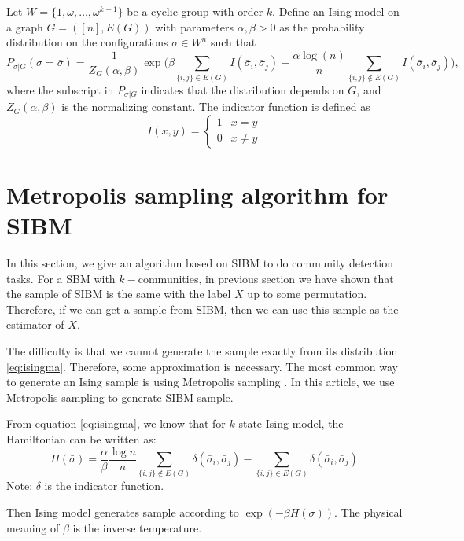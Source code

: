 \documentclass{ctexart}
\begin{document}
	Let $W=\{1, \omega, \dots, \omega^{k-1}\}$ be a cyclic group with order $k$.
	Define an Ising model on a graph $G=([n],E(G))$ with parameters $\alpha,\beta>0$
	as the probability distribution on the configurations $\sigma\in W^n$ such that
	\begin{equation} \label{eq:isingma}
	P_{\sigma|G}(\sigma=\bar{\sigma})=\frac{1}{Z_G(\alpha,\beta)}
	\exp\Big(\beta\sum_{\{i,j\}\in E(G)} I(\bar{\sigma}_i ,\bar{\sigma}_j)
	-\frac{\alpha\log(n)}{n} \sum_{\{i,j\}\notin E(G)} I(\bar{\sigma}_i, \bar{\sigma}_j)\Big) ,
	\end{equation}
	where the subscript in $P_{\sigma|G}$ indicates that the distribution depends on $G$, and 
	$Z_G(\alpha,\beta)$
	is the normalizing constant. The indicator function is defined as
	$$
	I(x ,y) = \begin{cases}
	1 & x = y\\
	0 & x \neq y
	\end{cases}
	$$
	
	\section{Metropolis sampling algorithm for SIBM}
	In this section, we give an algorithm based on SIBM to do community detection tasks.
	For a SBM with $k-$communities, in previous section we have shown that the sample of SIBM is the same with the label $X$ up to some permutation. 
	Therefore, if we can get a sample from SIBM, then we can use this sample as the estimator of $X$.
	
	The difficulty is that we cannot generate the sample exactly from its distribution \eqref{eq:isingma}. Therefore, some approximation is
	necessary. The most common way to generate an Ising sample is using Metropolis sampling \cite{metropolis1953equation}.
	In this article, we use Metropolis sampling to generate SIBM sample.
	
	From equation \eqref{eq:isingma}, we know that for $k$-state Ising model, the Hamiltonian can be written as:
	\begin{equation}
	H(\bar{\sigma}) = \frac{\alpha}{\beta} \frac{\log n}{n} \sum_{\{i,j\}\not\in E(G)} \delta(\bar{\sigma}_i, \bar{\sigma}_j)
		- \sum_{\{i,j\}\in E(G)} \delta(\bar{\sigma}_i, \bar{\sigma}_j)
	\end{equation}
	Note: $\delta$ is the indicator function.
	
	Then Ising model generates sample according to $\exp(-\beta H(\bar{\sigma}))$. The physical meaning of $\beta$ is the inverse temperature.
	
\end{document}
